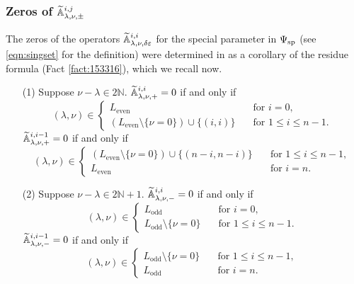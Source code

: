 \subsubsection{Zeros of ${\widetilde{\mathbb{A}}}_{{\lambda},{\nu},{\pm}}^{{i,j}}$}

The zeros of the operators ${\widetilde{\mathbb{A}}}_{{\lambda},{\nu},{\delta\varepsilon}}^{{i,i}}$
 for the special parameter
 in 
 $\Psi_{{\operatorname{sp}}}$
 (see \eqref{eqn:singset} for the definition)
 were determined in \cite{xkresidue}
 as a corollary of the residue formula
 (Fact \ref{fact:153316}), 
 which we recall now.  
\begin{corollary}
\label{cor:Avanish}
\begin{enumerate}
\item[{\rm{(1)}}]
Suppose $\nu - \lambda \in 2 {\mathbb{N}}$.  
\newline
${\widetilde{\mathbb{A}}}_{{\lambda},{\nu},{+}}^{{i,i}}=0$
if and only if
\begin{equation*}
(\lambda, \nu)\in 
\begin{cases}
L_{\operatorname{even}}
&\text{for $i=0$}, 
\\
(L_{\operatorname{even}} \setminus \{\nu =0\})\cup \{(i,i)\}
\quad
&\text{for $1 \le i \le n-1$}.   
\end{cases}
\end{equation*}
${\widetilde{\mathbb{A}}}_{{\lambda},{\nu},{+}}^{{i,i-1}}=0$
if and only if
\begin{equation*}
(\lambda, \nu)\in 
\begin{cases}
(L_{\operatorname{even}} \setminus \{\nu =0\})\cup \{(n-i,n-i)\}
\quad
&\text{for $1 \le i \le n-1$}, 
\\
L_{\operatorname{even}}
&\text{for $i=n$}.   
\end{cases}
\end{equation*}
\item[{\rm{(2)}}]
Suppose $\nu - \lambda \in 2 {\mathbb{N}}+1$.  
\newline
${\widetilde{\mathbb{A}}}_{{\lambda},{\nu},{-}}^{{i,i}}=0$
if and only if
\begin{equation*}
(\lambda, \nu)\in 
\begin{cases}
L_{\operatorname{odd}}
&\text{for $i=0$}, 
\\
L_{\operatorname{odd}} \setminus \{\nu =0\}
\quad
&\text{for $1 \le i \le n-1$}.   
\end{cases}
\end{equation*}
${\widetilde{\mathbb{A}}}_{{\lambda},{\nu},{-}}^{{i,i-1}}=0$
if and only if
\begin{equation*}
(\lambda, \nu)\in 
\begin{cases}
L_{\operatorname{odd}} \setminus \{\nu =0\}
\quad
&\text{for $1 \le i \le n-1$}, 
\\
L_{\operatorname{odd}}
&\text{for $i=n$}.   
\end{cases}
\end{equation*}
\end{enumerate}
\end{corollary}

